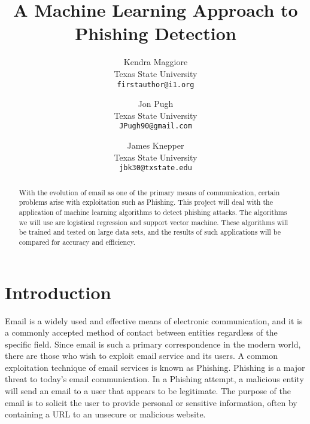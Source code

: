 \documentclass[10pt,twocolumn,letterpaper]{article}
\begin{document}
\title{A Machine Learning Approach to Phishing Detection}

\author{Kendra Maggiore\\
Texas State University\\
{\tt\small firstauthor@i1.org}
\and
Jon Pugh\\
Texas State University\\
{\tt\small JPugh90@gmail.com}
\and
James Knepper\\
Texas State University\\
{\tt\small jbk30@txstate.edu}
}

\maketitle

\begin{abstract}
   With the evolution of email as one of the primary means of communication, certain problems arise with exploitation such as Phishing.  This project will deal with the application of machine learning algorithms to detect phishing attacks.  The algorithms we will use are logistical regression and support vector machine.  These algorithms will be trained and tested on large data sets, and the results of such applications will be compared for accuracy and efficiency.  
\end{abstract}

\section{Introduction}

Email is a widely used and effective means of electronic communication, and it is a commonly accepted method of contact between entities regardless of the specific field.  Since email is such a primary correspondence in the modern world, there are those who wish to exploit email service and its users.  A common exploitation technique of email services is known as Phishing.  Phishing is a major threat to today’s email communication.  In a Phishing attempt, a malicious entity will send an email to a user that appears to be legitimate.  The purpose of the email is to solicit the user to provide personal or sensitive information, often by containing a URL to an unsecure or malicious website.
\end{document}
